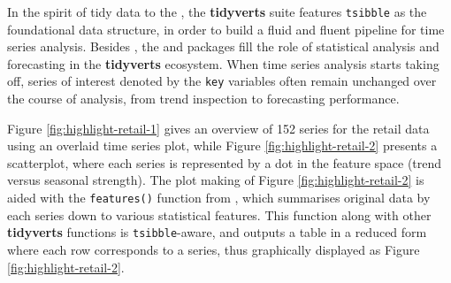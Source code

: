In the spirit of tidy data to the 
\citep{Wickham2019}, the \textbf{tidyverts} suite features
\texttt{tsibble} as the foundational data structure, in order to build a
fluid and fluent pipeline for time series analysis. Besides
, the  \citep{R-feasts} and
 \citep{R-fable} packages fill the role of statistical
analysis and forecasting in the \textbf{tidyverts} ecosystem. When time
series analysis starts taking off, series of interest denoted by the
\texttt{key} variables often remain unchanged over the course of
analysis, from trend inspection to forecasting performance.

Figure \ref{fig:highlight-retail-1} gives an overview of 152 series for
the retail data using an overlaid time series plot, while Figure
\ref{fig:highlight-retail-2} presents a scatterplot, where each series
is represented by a dot in the feature space (trend versus seasonal
strength). The plot making of Figure \ref{fig:highlight-retail-2} is
aided with the \texttt{features()} function from , which
summarises original data by each series down to various statistical
features. This function along with other \textbf{tidyverts} functions is
\texttt{tsibble}-aware, and outputs a table in a reduced form where each
row corresponds to a series, thus graphically displayed as Figure
\ref{fig:highlight-retail-2}.


